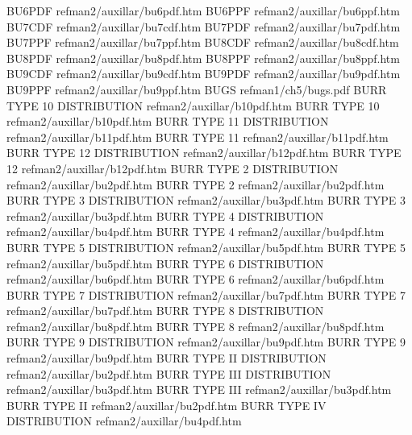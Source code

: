 BU6PDF                                  refman2/auxillar/bu6pdf.htm
BU6PPF                                  refman2/auxillar/bu6ppf.htm
BU7CDF                                  refman2/auxillar/bu7cdf.htm
BU7PDF                                  refman2/auxillar/bu7pdf.htm
BU7PPF                                  refman2/auxillar/bu7ppf.htm
BU8CDF                                  refman2/auxillar/bu8cdf.htm
BU8PDF                                  refman2/auxillar/bu8pdf.htm
BU8PPF                                  refman2/auxillar/bu8ppf.htm
BU9CDF                                  refman2/auxillar/bu9cdf.htm
BU9PDF                                  refman2/auxillar/bu9pdf.htm
BU9PPF                                  refman2/auxillar/bu9ppf.htm
BUGS                                    refman1/ch5/bugs.pdf
BURR TYPE 10 DISTRIBUTION               refman2/auxillar/b10pdf.htm
BURR TYPE 10                            refman2/auxillar/b10pdf.htm
BURR TYPE 11 DISTRIBUTION               refman2/auxillar/b11pdf.htm
BURR TYPE 11                            refman2/auxillar/b11pdf.htm
BURR TYPE 12 DISTRIBUTION               refman2/auxillar/b12pdf.htm
BURR TYPE 12                            refman2/auxillar/b12pdf.htm
BURR TYPE 2 DISTRIBUTION                refman2/auxillar/bu2pdf.htm
BURR TYPE 2                             refman2/auxillar/bu2pdf.htm
BURR TYPE 3 DISTRIBUTION                refman2/auxillar/bu3pdf.htm
BURR TYPE 3                             refman2/auxillar/bu3pdf.htm
BURR TYPE 4 DISTRIBUTION                refman2/auxillar/bu4pdf.htm
BURR TYPE 4                             refman2/auxillar/bu4pdf.htm
BURR TYPE 5 DISTRIBUTION                refman2/auxillar/bu5pdf.htm
BURR TYPE 5                             refman2/auxillar/bu5pdf.htm
BURR TYPE 6 DISTRIBUTION                refman2/auxillar/bu6pdf.htm
BURR TYPE 6                             refman2/auxillar/bu6pdf.htm
BURR TYPE 7 DISTRIBUTION                refman2/auxillar/bu7pdf.htm
BURR TYPE 7                             refman2/auxillar/bu7pdf.htm
BURR TYPE 8 DISTRIBUTION                refman2/auxillar/bu8pdf.htm
BURR TYPE 8                             refman2/auxillar/bu8pdf.htm
BURR TYPE 9 DISTRIBUTION                refman2/auxillar/bu9pdf.htm
BURR TYPE 9                             refman2/auxillar/bu9pdf.htm
BURR TYPE II DISTRIBUTION               refman2/auxillar/bu2pdf.htm
BURR TYPE III DISTRIBUTION              refman2/auxillar/bu3pdf.htm
BURR TYPE III                           refman2/auxillar/bu3pdf.htm
BURR TYPE II                            refman2/auxillar/bu2pdf.htm
BURR TYPE IV DISTRIBUTION               refman2/auxillar/bu4pdf.htm
